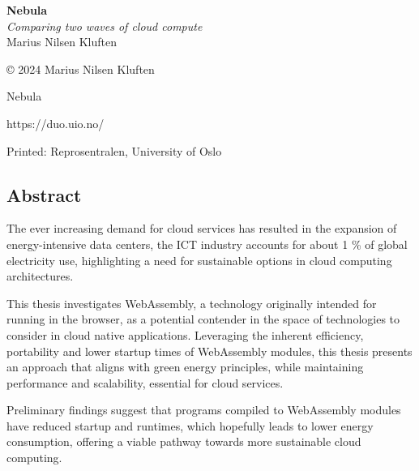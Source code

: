 \documentclass[
  table]{report}
\begin{document}
\newpage

\begin{center}
\vspace*{\fill} 
\Huge \textbf{Nebula} \\[10pt]
\vspace{2cm} 
\Large \textit{Comparing two waves of cloud compute} \\[20pt]
\vspace{2cm} 
\Large Marius Nilsen Kluften \\[30pt]
\vspace*{\fill} 
\end{center}

\newpage

\null\vfill
\begin{flushleft}
\Large © 2024 Marius Nilsen Kluften\par
\Large Nebula \par
\Large https://duo.uio.no/ \par
\Large Printed: Reprosentralen, University of Oslo \par
\end{flushleft}

\newpage
\fancyfoot[C]{ \thepage\ }

\vspace*{\fill}
\begin{center}
\begin{minipage}{0.75\textwidth}

\chapter*{Abstract}

The ever increasing demand for cloud services has resulted in the expansion of
energy-intensive data centers, the ICT industry accounts for about 1 \% of global 
electricity use, highlighting a need for sustainable options
in cloud computing architectures.

\vspace{0.25cm}

This thesis investigates WebAssembly, a technology originally intended for running 
in the browser, as a potential contender in the space of technologies to
consider in cloud native applications. Leveraging the inherent efficiency,
portability and lower startup times of WebAssembly modules, this thesis presents an
approach that aligns with green energy principles, while maintaining performance and
scalability, essential for cloud services. 

\vspace{0.25cm}

Preliminary findings suggest that programs compiled to WebAssembly modules have
reduced startup and runtimes, which hopefully leads to lower energy consumption,
offering a viable pathway towards more sustainable cloud computing.

\end{minipage}
\end{center}
\vspace*{\fill}
\end{document}
